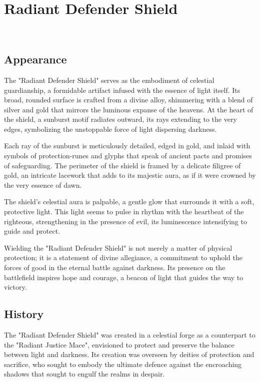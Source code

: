 
\chapter*{Radiant Defender Shield}
\\

\section*{Appearance}
The "Radiant Defender Shield" serves as the embodiment of celestial guardianship, a formidable artifact infused with the essence of light itself. Its broad, rounded surface is crafted from a divine alloy, shimmering with a blend of silver and gold that mirrors the luminous expanse of the heavens. At the heart of the shield, a sunburst motif radiates outward, its rays extending to the very edges, symbolizing the unstoppable force of light dispersing darkness.

Each ray of the sunburst is meticulously detailed, edged in gold, and inlaid with symbols of protection-runes and glyphs that speak of ancient pacts and promises of safeguarding. The perimeter of the shield is framed by a delicate filigree of gold, an intricate lacework that adds to its majestic aura, as if it were crowned by the very essence of dawn.

The shield's celestial aura is palpable, a gentle glow that surrounds it with a soft, protective light. This light seems to pulse in rhythm with the heartbeat of the righteous, strengthening in the presence of evil, its luminescence intensifying to guide and protect.

Wielding the "Radiant Defender Shield" is not merely a matter of physical protection; it is a statement of divine allegiance, a commitment to uphold the forces of good in the eternal battle against darkness. Its presence on the battlefield inspires hope and courage, a beacon of light that guides the way to victory.

\section*{History}
The "Radiant Defender Shield" was created in a celestial forge as a counterpart to the "Radiant Justice Mace", envisioned to protect and preserve the balance between light and darkness. Its creation was overseen by deities of protection and sacrifice, who sought to embody the ultimate defence against the encroaching shadows that sought to engulf the realms in despair.

